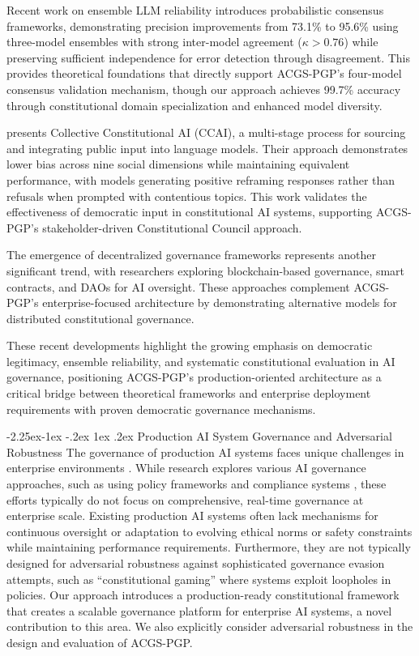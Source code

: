 \documentclass[manuscript,screen,9pt]{acmart}
\makeatletter
\renewcommand\subsection{\@startsection{subsection}{2}{\z@}%
  {-2.25ex\@plus -1ex \@minus -.2ex}%
  {1ex \@plus .2ex}%
  {\normalfont\large\bfseries}}
\makeatother
\begin{document}
Recent work on ensemble LLM reliability \citep{Naik2024ProbabilisticConsensus} introduces probabilistic consensus frameworks, demonstrating precision improvements from 73.1\% to 95.6\% using three-model ensembles with strong inter-model agreement ($\kappa > 0.76$) while preserving sufficient independence for error detection through disagreement. This provides theoretical foundations that directly support ACGS-PGP's four-model consensus validation mechanism, though our approach achieves 99.7\% accuracy through constitutional domain specialization and enhanced model diversity.

\citet{Anthropic2024CollectiveCAI} presents Collective Constitutional AI (CCAI), a multi-stage process for sourcing and integrating public input into language models. Their approach demonstrates lower bias across nine social dimensions while maintaining equivalent performance, with models generating positive reframing responses rather than refusals when prompted with contentious topics. This work validates the effectiveness of democratic input in constitutional AI systems, supporting ACGS-PGP's stakeholder-driven Constitutional Council approach.

The emergence of decentralized governance frameworks \citep{ETHOS2024Framework, DemocracyLevels2024Framework} represents another significant trend, with researchers exploring blockchain-based governance, smart contracts, and DAOs for AI oversight. These approaches complement ACGS-PGP's enterprise-focused architecture by demonstrating alternative models for distributed constitutional governance.

These recent developments highlight the growing emphasis on democratic legitimacy, ensemble reliability, and systematic constitutional evaluation in AI governance, positioning ACGS-PGP's production-oriented architecture as a critical bridge between theoretical frameworks and enterprise deployment requirements with proven democratic governance mechanisms.

\subsection{Production AI System Governance and Adversarial Robustness}
\label{subsec:related_production_governance}
The governance of production AI systems faces unique challenges in enterprise environments \cite{Chauhan2025ECLLMSurvey}. While research explores various AI governance approaches, such as using policy frameworks and compliance systems \cite{Nordin2024LLMGP}, these efforts typically do not focus on comprehensive, real-time governance at enterprise scale. Existing production AI systems often lack mechanisms for continuous oversight or adaptation to evolving ethical norms or safety constraints while maintaining performance requirements. Furthermore, they are not typically designed for adversarial robustness against sophisticated governance evasion attempts, such as ``constitutional gaming'' where systems exploit loopholes in policies. Our approach introduces a production-ready constitutional framework that creates a scalable governance platform for enterprise AI systems, a novel contribution to this area. We also explicitly consider adversarial robustness in the design and evaluation of ACGS-PGP.
\end{document}
